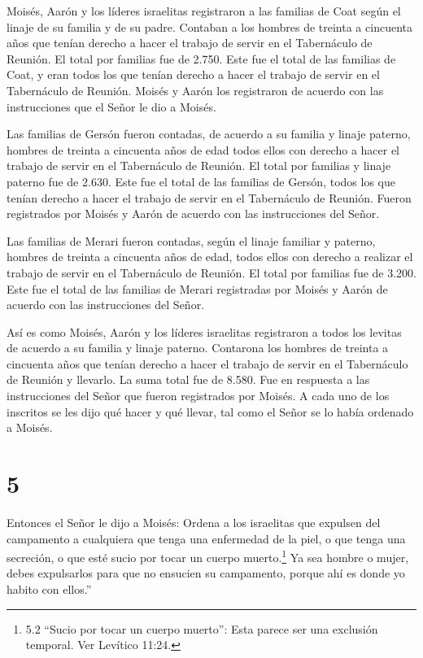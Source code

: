  Moisés, Aarón y los líderes israelitas registraron a las
familias de Coat según el linaje de su familia y de su padre.
 Contaban a los hombres de treinta a cincuenta años que
tenían derecho a hacer el trabajo de servir en el Tabernáculo de
Reunión.  El total por familias fue de 2.750. 
Este fue el total de las familias de Coat, y eran todos los que tenían
derecho a hacer el trabajo de servir en el Tabernáculo de Reunión.
Moisés y Aarón los registraron de acuerdo con las instrucciones que el
Señor le dio a Moisés.

 Las familias de Gersón fueron contadas, de acuerdo a su
familia y linaje paterno,  hombres de treinta a cincuenta
años de edad todos ellos con derecho a hacer el trabajo de servir en el
Tabernáculo de Reunión.  El total por familias y linaje
paterno fue de 2.630.  Este fue el total de las familias de
Gersón, todos los que tenían derecho a hacer el trabajo de servir en el
Tabernáculo de Reunión. Fueron registrados por Moisés y Aarón de acuerdo
con las instrucciones del Señor.

 Las familias de Merari fueron contadas, según el linaje
familiar y paterno,  hombres de treinta a cincuenta años de
edad, todos ellos con derecho a realizar el trabajo de servir en el
Tabernáculo de Reunión.  El total por familias fue de
3.200.  Este fue el total de las familias de Merari
registradas por Moisés y Aarón de acuerdo con las instrucciones del
Señor.

 Así es como Moisés, Aarón y los líderes israelitas
registraron a todos los levitas de acuerdo a su familia y linaje
paterno.  Contarona los hombres de treinta a cincuenta años
que tenían derecho a hacer el trabajo de servir en el Tabernáculo de
Reunión y llevarlo.  La suma total fue de 8.580.
 Fue en respuesta a las instrucciones del Señor que fueron
registrados por Moisés. A cada uno de los inscritos se les dijo qué
hacer y qué llevar, tal como el Señor se lo había ordenado a Moisés.

\hypertarget{section-4}{%
\section{5}\label{section-4}}

 Entonces el Señor le dijo a Moisés:  Ordena a
los israelitas que expulsen del campamento a cualquiera que tenga una
enfermedad de la piel, o que tenga una secreción, o que esté sucio por
tocar un cuerpo muerto.\footnote{5.2 ``Sucio por tocar un cuerpo
  muerto'': Esta parece ser una exclusión temporal. Ver Levítico 11:24.}
 Ya sea hombre o mujer, debes expulsarlos para que no
ensucien su campamento, porque ahí es donde yo habito con ellos.''

